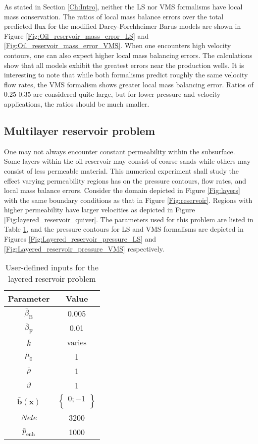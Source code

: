 \documentclass[11pt,reqno]{amsart}
\begin{document}
As stated in Section \ref{Ch:Intro}, neither the LS nor VMS formalisms have local mass conservation. 
The ratios of local mass balance errors over the total predicted flux for the modified Darcy-Forchheimer 
Barus models are shown in Figure \ref{Fig:Oil_reservoir_mass_error_LS} and 
\ref{Fig:Oil_reservoir_mass_error_VMS}. When one encounters high velocity 
contours, one can also expect higher local mass balancing errors. The calculations 
show that all models exhibit the greatest errors near the production wells. It is 
interesting to note that while both formalisms predict roughly the same velocity flow rates, 
the VMS formalism shows greater local mass balancing error. Ratios of 0.25-0.35 are 
considered quite large, but for lower pressure and velocity applications, 
the ratios should be much smaller.

\subsection{Multilayer reservoir problem}
One may not always encounter constant permeability within the subsurface. Some layers 
within the oil reservoir may consist of coarse sands while others may consist of less permeable 
material. This numerical experiment shall study the effect varying permeability regions
has on the pressure contours, flow rates, and local mass balance errors. Consider the domain 
depicted in Figure \ref{Fig:layers} with the same boundary conditions
as that in Figure \ref{Fig:reservoir}. Regions with higher permeability have larger velocities as 
depicted in Figure \ref{Fig:layered_reservoir_quiver}. The parameters used for this problem are 
listed in Table \ref{Tab:layered_reservoir}, and the pressure contours for LS and VMS formalisms are depicted in Figures 
\ref{Fig:Layered_reservoir_pressure_LS} and \ref{Fig:Layered_reservoir_pressure_VMS} respectively.
\begin{table}[b!]
  \centering
  \caption{User-defined inputs for the layered reservoir problem}
  \begin{tabular}{cc}
    \hline
    Parameter & Value \\ \hline
    $\bar{\beta}_{\mathrm{B}}$ & 0.005\\
    $\bar{\beta}_{\mathrm{F}}$ & 0.01\\	
    $\bar{k}$ & varies\\
    $\bar{\mu}_0$ & 1\\
    $\bar{\rho}$ & 1 \\
    $\vartheta$ & 1 \\
    $\bar{\mathbf{b}}(\mathbf{x})$ & $\begin{Bmatrix}0;-1\\ \end{Bmatrix} $\\
    $Nele$ & 3200\\
    $\bar{p}_{\mathrm{enh}}$ & 1000\\
    \hline
  \end{tabular}
  \label{Tab:layered_reservoir}
\end{table}
\end{document}
